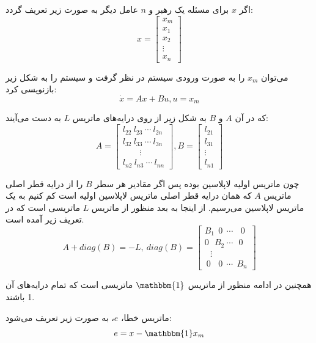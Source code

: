 اگر $x$ برای مسئله یک رهبر و $n$ عامل دیگر به صورت زیر تعریف گردد:
\begin{equation}
x = 
\begin{bmatrix}
x_m \\
x_1 \\
x_2 \\
\vdots \\
x_n
\end{bmatrix}
\end{equation}

می‌توان $x_m$ را به صورت ورودی سیستم در نظر گرفت و سیستم را به شکل زیر بازنویسی کرد:
\begin{equation}\label{eq platoon system}
	\dot{x} = Ax + Bu, u = x_m
\end{equation}

که در آن $A$ و $B$ به شکل زیر از روی درایه‌های ماتریس $L$ به دست می‌آیند:
\begin{equation}\label{eq platoon AB}
A = 
\begin{bmatrix}
l_{22}~l_{23}~\cdots~l_{2n} \\
l_{32}~l_{33}~\cdots~l_{3n} \\
~~~~~~~~~\vdots~~~~~~~~~\\
l_{n2}~l_{n3}~\cdots~l_{nn} 
\end{bmatrix}
, B = 
\begin{bmatrix}
l_{21}\\
l_{31}\\
\vdots\\
l_{n1} 
\end{bmatrix}
\end{equation}

چون ماتریس اولیه لاپلاسین بوده پس اگر مقادیر هر سطر $B$ را از درایه قطر اصلی ماتریس $A$ که همان درایه قطر اصلی ماتریس لاپلاسین اولیه است کم کنیم به یک ماتریس لاپلاسین می‌رسیم. از اینجا به بعد منظور از ماتریس $L$ ماتریسی است که در تعریف زیر آمده است.
\begin{equation}\label{eq ABL relation}
	A + diag(B) = -L,~ diag(B) = 
	\begin{bmatrix}
	B_1~~0~~\cdots~~~~0 \\
	0~~~B_2~\cdots~~~0 \\
	~~~\vdots~~~\\
	~0~~~~0~~\cdots~~B_n
	\end{bmatrix}
\end{equation}

همچنین در ادامه منظور از ماتریس $\mathbbm{1}$ ماتریسی است که تمام درایه‌های آن 1 باشند.

ماتریس خطا، $e$، به صورت زیر تعریف می‌شود:
\begin{equation}\label{eq e definition}
	e = x - \mathbbm{1}x_m
\end{equation}

